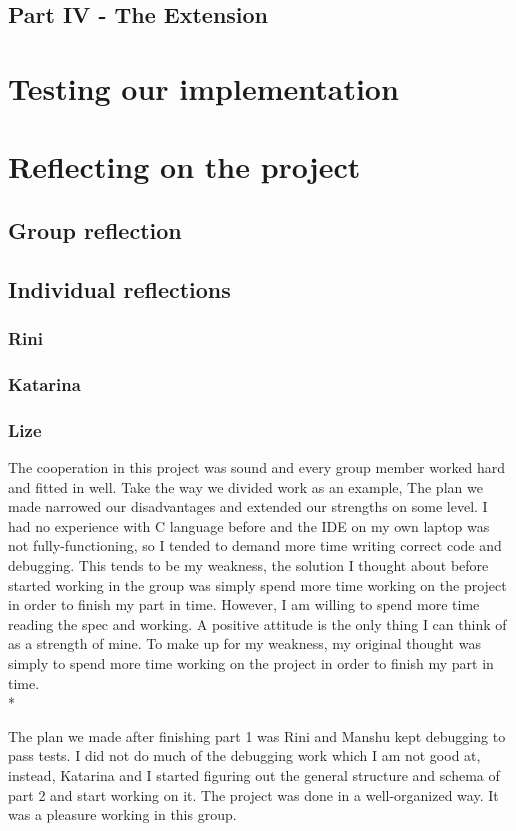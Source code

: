 \documentclass[letterpaper,11pt]{article}
\begin{document}
    \subsection{Part IV - The Extension}
    \section{Testing our implementation}
    \section{Reflecting on the project}
    \subsection{Group reflection}
    \subsection{Individual reflections}
    \subsubsection{Rini}
    \subsubsection{Katarina}
    \subsubsection{Lize}
    The cooperation in this project was sound and every group member worked hard and fitted in well. Take the way we divided work as an example, The plan we made narrowed our disadvantages and extended our strengths on some level. I had no experience with C language before and the IDE on my own laptop was not fully-functioning, so I tended to demand more time writing correct code and debugging. This tends to be my weakness, the solution I thought about before started working in the group was simply spend more time working on the project in order to finish my part in time. However, I am willing to spend more time reading the spec and working. A positive attitude is the only thing I can think of as a strength of mine. To make up for my weakness, my original thought was simply to spend more time working on the project in order to finish my part in time.\\*

    \noindent The plan we made after finishing part 1 was Rini and Manshu kept debugging to pass tests. I did not do much of the debugging work which I am not good at, instead, Katarina and I started figuring out the general structure and schema of part 2 and start working on it. The project was done in a well-organized way. It was a pleasure working in this group.
\end{document}
